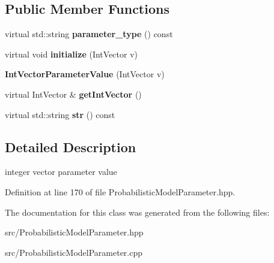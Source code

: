 \subsection*{Public Member Functions}
\begin{DoxyCompactItemize}
\item 
\mbox{\label{classtops_1_1IntVectorParameterValue_a668df50ce2945a990e6066cd2c196c09}} 
virtual std\+::string {\bfseries parameter\+\_\+type} () const
\item 
\mbox{\label{classtops_1_1IntVectorParameterValue_a0ac22f4ff93184ec29a0e253fe75c09f}} 
virtual void {\bfseries initialize} (Int\+Vector v)
\item 
\mbox{\label{classtops_1_1IntVectorParameterValue_a25ce873a9463e46d667808c829aa9ca4}} 
{\bfseries Int\+Vector\+Parameter\+Value} (Int\+Vector v)
\item 
\mbox{\label{classtops_1_1IntVectorParameterValue_a580a4ed0cd4ccffda0f797e17bff36c3}} 
virtual Int\+Vector \& {\bfseries get\+Int\+Vector} ()
\item 
\mbox{\label{classtops_1_1IntVectorParameterValue_a2f1efd5afd32b4ebeed8a166a53922ff}} 
virtual std\+::string {\bfseries str} () const
\end{DoxyCompactItemize}


\subsection{Detailed Description}
integer vector parameter value 

Definition at line 170 of file Probabilistic\+Model\+Parameter.\+hpp.



The documentation for this class was generated from the following files\+:\begin{DoxyCompactItemize}
\item 
src/Probabilistic\+Model\+Parameter.\+hpp\item 
src/Probabilistic\+Model\+Parameter.\+cpp\end{DoxyCompactItemize}
